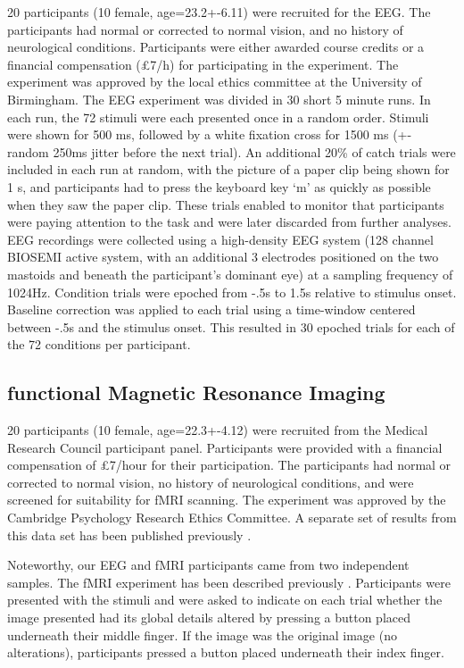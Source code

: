 \documentclass[10pt,letterpaper]{article}
\begin{document}
20 participants (10 female, age=23.2+-6.11) were recruited for the 
EEG. The participants had normal or corrected to normal vision, 
and no history of neurological conditions. Participants were either 
awarded course credits or a financial compensation (£7/h) for 
participating in the experiment. The experiment was approved by the 
local ethics committee at the University of Birmingham.
The EEG experiment was divided in 30 short 5 minute runs. In each run, 
the 72 stimuli were each presented once in a random order. Stimuli were 
shown for 500 ms, followed by a white fixation cross for 1500 ms (+- 
random 250ms jitter before the next trial). An additional 20\% of catch trials 
were included in each run at random, with the picture of a paper clip 
being shown for 1 s, and participants had to press the keyboard key ‘m’ 
as quickly as possible when they saw the paper clip. These trials enabled 
to monitor that participants were paying attention to the task and were 
later discarded from further analyses. EEG recordings were collected 
using a high-density EEG system (128 channel BIOSEMI active system, 
with an additional 3 electrodes positioned on the two mastoids and 
beneath the participant’s dominant eye) at a sampling frequency of 
1024Hz. Condition trials were epoched from -.5s to 1.5s relative to 
stimulus onset.  Baseline correction was applied to each trial using 
a time-window centered between -.5s and the stimulus onset. This 
resulted in 30 epoched trials for each of the 72 conditions per participant.

\subsection{functional Magnetic Resonance Imaging}

20 participants (10 female, age=22.3+-4.12) were recruited from the 
Medical Research Council participant panel. Participants were provided 
with a financial compensation of £7/hour for their participation. The 
participants had normal or corrected to normal vision, no history of 
neurological conditions, and were screened for suitability for fMRI 
scanning. The experiment was approved by the Cambridge Psychology 
Research Ethics Committee. A separate set of results from this data 
set has been published previously \cite{Charest2014-zn}.

Noteworthy, our EEG and fMRI participants came from two independent 
samples.  The fMRI experiment has been described previously 
\cite{Charest2014-zn}. Participants were presented with the 
stimuli and were asked to indicate on each trial whether the 
image presented had its global details altered by pressing 
a button placed underneath their middle finger. If the image was 
the original image (no alterations), participants pressed a button 
placed underneath their index finger.  
\end{document}
